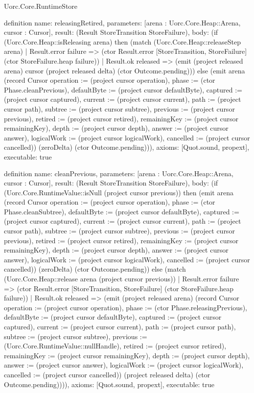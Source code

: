 \begin{lexlean}{Uorc.Core.RuntimeStore}
\begin{semanticmodule}
definition{
  name: releasingRetired,
  parameters: [arena : Uorc.Core.Heap::Arena, cursor : Cursor],
  result: (Result StoreTransition StoreFailure),
  body: (if (Uorc.Core.Heap::isReleasing arena) then (match (Uorc.Core.Heap::releaseStep arena)
    | Result.error failure => (ctor Result.error [StoreTransition, StoreFailure] (ctor StoreFailure.heap failure))
    | Result.ok released => (emit (project released arena) cursor (project released delta) (ctor Outcome.pending))) else (emit arena (record Cursor {operation := (project cursor operation), phase := (ctor Phase.cleanPrevious), defaultByte := (project cursor defaultByte), captured := (project cursor captured), current := (project cursor current), path := (project cursor path), subtree := (project cursor subtree), previous := (project cursor previous), retired := (project cursor retired), remainingKey := (project cursor remainingKey), depth := (project cursor depth), answer := (project cursor answer), logicalWork := (project cursor logicalWork), cancelled := (project cursor cancelled)}) (zeroDelta) (ctor Outcome.pending))),
  axioms: [Quot.sound, propext],
  executable: true
}

definition{
  name: cleanPrevious,
  parameters: [arena : Uorc.Core.Heap::Arena, cursor : Cursor],
  result: (Result StoreTransition StoreFailure),
  body: (if (Uorc.Core.RuntimeValue::isNull (project cursor previous)) then (emit arena (record Cursor {operation := (project cursor operation), phase := (ctor Phase.cleanSubtree), defaultByte := (project cursor defaultByte), captured := (project cursor captured), current := (project cursor current), path := (project cursor path), subtree := (project cursor subtree), previous := (project cursor previous), retired := (project cursor retired), remainingKey := (project cursor remainingKey), depth := (project cursor depth), answer := (project cursor answer), logicalWork := (project cursor logicalWork), cancelled := (project cursor cancelled)}) (zeroDelta) (ctor Outcome.pending)) else (match (Uorc.Core.Heap::release arena (project cursor previous))
    | Result.error failure => (ctor Result.error [StoreTransition, StoreFailure] (ctor StoreFailure.heap failure))
    | Result.ok released => (emit (project released arena) (record Cursor {operation := (project cursor operation), phase := (ctor Phase.releasingPrevious), defaultByte := (project cursor defaultByte), captured := (project cursor captured), current := (project cursor current), path := (project cursor path), subtree := (project cursor subtree), previous := (Uorc.Core.RuntimeValue::nullHandle), retired := (project cursor retired), remainingKey := (project cursor remainingKey), depth := (project cursor depth), answer := (project cursor answer), logicalWork := (project cursor logicalWork), cancelled := (project cursor cancelled)}) (project released delta) (ctor Outcome.pending)))),
  axioms: [Quot.sound, propext],
  executable: true
}


\end{semanticmodule}
\end{lexlean}
